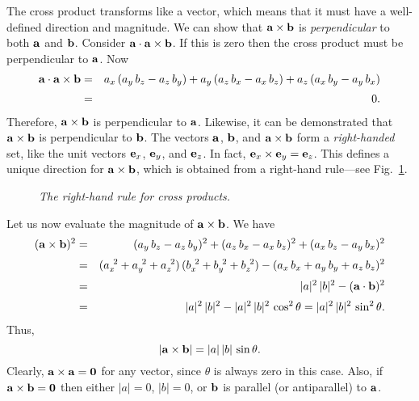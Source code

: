The cross product  transforms like a vector, which
means that it must have  a well-defined direction and magnitude. We can show
that ${\bf a}\times{\bf b}$ is {\em perpendicular} to both ${\bf a}$ and ${\bf b}$.
Consider ${\bf a}\cdot {\bf a}\times{\bf b}$. If this is zero then the cross product
must be perpendicular to ${\bf a}$. Now
\begin{eqnarray}
{\bf a}\cdot {\bf a}\times{\bf b} &= &a_x\,(a_y\, b_z-a_z\, b_y) + a_y\, (a_z\, b_x- a_x \,b_z)
+a_z\,(a_x \,b_y - a_y\, b_x)\nonumber\\[0.5ex]
&=& 0.
\end{eqnarray}
Therefore, ${\bf a}\times {\bf b}$ is perpendicular to ${\bf a}$. Likewise, it can
be demonstrated that ${\bf a}\times{\bf b}$ is perpendicular to ${\bf b}$. 
The vectors $\bf a$, $\bf b$, and ${\bf a}\times{\bf b}$ form a {\em right-handed}
set, like the unit vectors ${\bf e}_x$, ${\bf e}_y$, and ${\bf e}_z$. In fact,  ${\bf e}_x\times
{\bf e}_y={\bf e}_z$. This defines a unique direction for ${\bf a}\times{\bf b}$, which
is obtained from a right-hand rule---see Fig.~\ref{f6}.
\begin{figure}
\epsfysize=2in
\centerline{}
\caption{\em The right-hand rule for cross products.}\label{f6}
\end{figure}

Let us now evaluate the magnitude of ${\bf a}\times {\bf b}$. We have
\begin{eqnarray}
({\bf a}\times{\bf b})^2 &=& (a_y \,b_z-a_z\, b_y)^2 +(a_z \,b_x - a_x\, b_z)^2 +(a_x \,b_z
-a_y \,b_x)^2\nonumber\\[0.5ex]
&=& (a_x^{~2}+a_y^{~2}+a_z^{~2})\,(b_x^{~2}+b_y^{~2}+b_z^{~2}) -
(a_x\, b_x + a_y \,b_y + a_z\, b_z)^2\nonumber\\[0.5ex]
&=& |a|^2 \,|b|^2 - ({\bf a}\cdot {\bf b})^2\nonumber\\[0.5ex]
&=& |a|^2 \,|b|^2 - |a|^2 \,|b|^2 \,\cos^2\theta = |a|^2\,|b|^2\, \sin^2\theta.
\end{eqnarray}
Thus,
\begin{equation}
|{\bf a}\times{\bf b}| = |a|\,|b|\,\sin\theta.
\end{equation}
Clearly, ${\bf a}\times{\bf a} = {\bf 0}$ for any vector, since $\theta$ is always
zero in this case. Also, if ${\bf a}\times{\bf b} = {\bf 0}$ then either
$|a|=0$, $|b|=0$, or ${\bf b}$ is parallel (or antiparallel) to ${\bf a}$.

